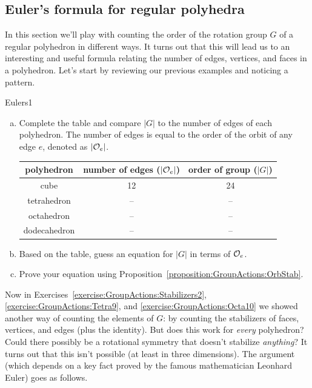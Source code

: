\subsection{Euler's formula for regular polyhedra}
\label{subsec:GroupActions:SymmetryOfPolyhedra:Euler}

In this section we'll play with counting the order of the rotation group $G$ of a regular polyhedron in different ways. It turns out that this will lead us to an interesting and useful formula relating the number of edges, vertices, and faces in a polyhedron.
Let's start by reviewing our previous examples and noticing a pattern.

\begin{exercise}{Eulers1}
\begin{enumerate}[(a)]
\item
Complete the table and compare $|G|$ to the number of edges of each polyhedron.  The number of edges is equal to the order of the orbit of any edge $e$, denoted as $|{\cal O}_e|$.

\begin{tabular}{|c | c | c|}\hline
polyhedron & number of edges ($|{\cal O}_e|$) & order of group ($|G|$)\\ \hline
cube &  12 &   24\\ \hline
tetrahedron &  -- &   --\\ \hline
octahedron & -- &--\\ \hline
dodecahedron &  --&--\\ \hline 
\end{tabular}
\item Based on the table, guess an equation for $|G|$ in terms of ${\cal O}_e$.
\item 
Prove your equation using Proposition~\ref{proposition:GroupActions:OrbStab}.
\end{enumerate}
\end {exercise}
 Now in Exercises~\ref{exercise:GroupActions:Stabilizers2}, \ref{exercise:GroupActions:Tetra9}, and \ref{exercise:GroupActions:Octa10}  we showed another way of counting the elements of $G$: by counting the stabilizers of faces, vertices, and edges (plus the identity). But does this work for \emph{every} polyhedron? Could there possibly be a rotational symmetry that doesn't stabilize \emph{anything}? It turns out that this isn't possible (at least in three dimensions). The argument (which depends on a key fact proved by the famous mathematician Leonhard Euler) goes as follows. 

